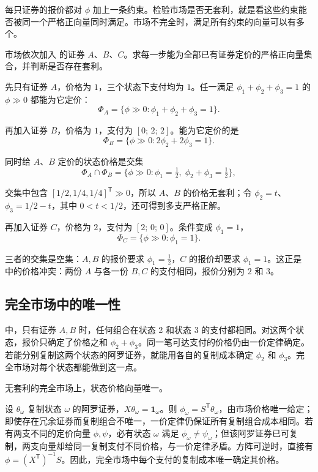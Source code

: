 每只证券的报价都对 $\phi$ 加上一条约束。检验市场是否无套利，就是看这些约束能否被同一个严格正向量同时满足。市场不完全时，满足所有约束的向量可以有多个。

\begin{tcolorbox}[example]
\begin{question}
市场依次加入 的证券 $A$、$B$、$C$。求每一步能为全部已有证券定价的严格正向量集合，并判断是否存在套利。
\end{question}
\begin{solution}
先只有证券 $A$，价格为 $1$，三个状态下支付均为 $1$。任一满足 $\phi_1+\phi_2+\phi_3=1$ 的 $\phi\gg 0$ 都能为它定价：
\[
    \Phi_A=\{\phi\gg 0:\phi_1+\phi_2+\phi_3=1\}.
\]

再加入证券 $B$，价格为 $1$，支付为 $[0;\,2;\,2]$。能为它定价的是
\[
    \Phi_B=\{\phi\gg 0:2\phi_2+2\phi_3=1\}.
\]

同时给 $A$、$B$ 定价的状态价格是交集
\[
    \Phi_A\cap\Phi_B=\{\phi\gg 0:\phi_1=\tfrac12,\;\phi_2+\phi_3=\tfrac12\},
\]

交集中包含 $[1/2,1/4,1/4]^{\mathsf T}\gg0$，所以 $A$、$B$ 的价格无套利；令 $\phi_2=t$、$\phi_3=1/2-t$，其中 $0<t<1/2$，还可得到多支严格正解。

再加入证券 $C$，价格为 $2$，支付为 $[2;\,0;\,0]$。条件变成 $\phi_1=1$，
\[
    \Phi_C=\{\phi\gg 0:\phi_1=1\}.
\]

三者的交集是空集：$A,B$ 的报价要求 $\phi_1=\tfrac12$，$C$ 的报价却要求 $\phi_1=1$。这正是 中的价格冲突：两份 $A$ 与各一份 $B,C$ 的支付相同，报价分别为 $2$ 和 $3$。
\end{solution}
\end{tcolorbox}

\subsection{完全市场中的唯一性}
 中，只有证券 $A,B$ 时，任何组合在状态 2 和状态 3 的支付都相同。对这两个状态，报价只确定了价格之和 $\phi_2+\phi_3$。同一笔可达支付的价格仍由一价定律确定。若能分别复制这两个状态的阿罗证券，就能用各自的复制成本确定 $\phi_2$ 和 $\phi_3$。完全市场对每个状态都能做到这一点。

\begin{tcolorbox}[knowledge]
无套利的完全市场上，状态价格向量唯一。
\end{tcolorbox}

\begin{solution}[label-content={证明},blank-type=none]
设 $\theta_\omega$ 复制状态 $\omega$ 的阿罗证券，$X\theta_\omega=\mathbf{1}_\omega$。则 $\phi_\omega=S^{\mathsf T}\theta_\omega$，由市场价格唯一给定；即使存在冗余证券而复制组合不唯一，一价定律仍保证所有复制组合成本相同。若有两支不同的定价向量 $\phi,\psi$，必有状态 $\omega$ 满足 $\phi_\omega\ne\psi_\omega$；但该阿罗证券已可复制，两支向量却给同一复制支付不同价格，与一价定律矛盾。方阵可逆时，直接有 $\phi=(X^{\mathsf T})^{-1}S$。因此，完全市场中每个支付的复制成本唯一确定其价格。
\end{solution}

